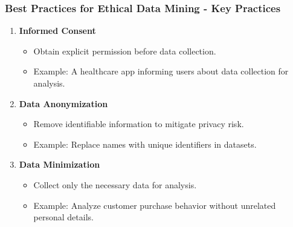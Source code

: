 \documentclass{beamer}
\begin{document}
\begin{frame}[fragile]
    \frametitle{Best Practices for Ethical Data Mining - Key Practices}
    \begin{enumerate}
        \item \textbf{Informed Consent}
        \begin{itemize}
            \item Obtain explicit permission before data collection.
            \item Example: A healthcare app informing users about data collection for analysis.
        \end{itemize}

        \item \textbf{Data Anonymization}
        \begin{itemize}
            \item Remove identifiable information to mitigate privacy risk.
            \item Example: Replace names with unique identifiers in datasets.
        \end{itemize}

        \item \textbf{Data Minimization}
        \begin{itemize}
            \item Collect only the necessary data for analysis.
            \item Example: Analyze customer purchase behavior without unrelated personal details.
        \end{itemize}
    \end{enumerate}
\end{frame}
\end{document}
